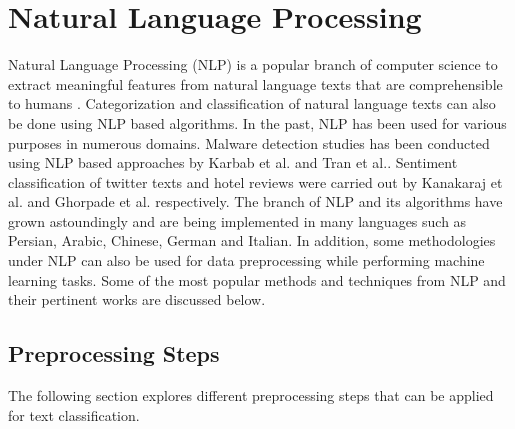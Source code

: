 \documentclass[a4paper,12pt,twoside]{report}
\begin{document}

\section{Natural Language Processing}

Natural Language Processing (NLP) is a popular branch of computer science to extract meaningful features from natural language texts that are comprehensible to humans \cite{Al-ghamdi2017} \cite{Suhaimin2017}. Categorization and classification of natural language texts can also be done using NLP based algorithms. In the past, NLP has been used for various purposes in numerous domains. Malware detection studies has been conducted using NLP based approaches by Karbab et al. \cite{Karbab2017} and Tran et al.\cite{Tran2017}. Sentiment classification of twitter texts and hotel reviews were carried out by Kanakaraj et al.\cite{Kanakaraj2015} and Ghorpade et al.\cite{Ghorpade2012} respectively. The branch of NLP and its algorithms have grown astoundingly and are being implemented in many languages such as Persian\cite{Ri}, Arabic\cite{Abuleil2007}, Chinese\cite{Liu2008}, German\cite{Metzmacher2017} and Italian\cite{Damiano2017}. 
\bigbreak
In addition, some methodologies under NLP can also be used for data preprocessing while performing machine learning tasks. Some of the most popular methods and techniques from NLP and their pertinent works are discussed below. 

\subsection{Preprocessing Steps}
The following section explores different preprocessing steps that can be applied for text classification. 
\end{document}
